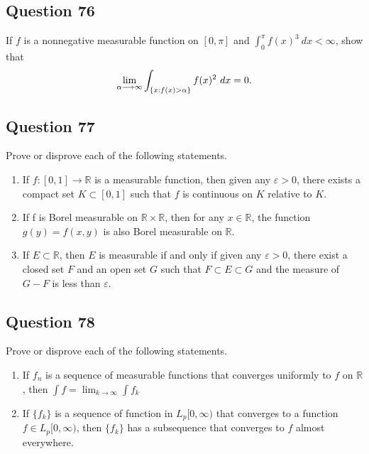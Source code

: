 \documentclass[12pt]{article}
\begin{document}
\hypertarget{question-76-1}{%
\subsection{Question 76}\label{question-76-1}}

If \(f\) is a nonnegative measurable function on \([0, \pi]\) and
\(\int_0^\pi f(x)^3~dx < \infty\), show that \begin{align*}
\lim_{\alpha\longrightarrow\infty} \int_{ \left\{{x :f(x) > \alpha}\right\} } f(x)^2 ~dx=0
.\end{align*}

\hypertarget{question-77-1}{%
\subsection{Question 77}\label{question-77-1}}

Prove or disprove each of the following statements.

\begin{enumerate}
\def\labelenumi{(\alph{enumi})}
\item
  If \(f : [0, 1] \to \mathbb{R}\) is a measurable function, then given
  any \(\varepsilon > 0\), there exists a compact set
  \(K \subset [0, 1]\) such that \(f\) is continuous on \(K\) relative
  to \(K\).
\item
  If f is Borel measurable on \(\mathbb{R} \times \mathbb{R}\), then for
  any \(x \in \mathbb{R}\), the function \(g(y) = f(x, y)\) is also
  Borel measurable on \(\mathbb{R}\).
\item
  If \(E \subset \mathbb{R}\), then \(E\) is measurable if and only if
  given any \(\varepsilon > 0\), there exist a closed set \(F\) and an
  open set \(G\) such that \(F \subset E \subset G\) and the measure of
  \(G-F\) is less than \(\varepsilon\).
\end{enumerate}

\hypertarget{question-78-1}{%
\subsection{Question 78}\label{question-78-1}}

Prove or disprove each of the following statements.

\begin{enumerate}
\def\labelenumi{(\alph{enumi})}
\setcounter{enumi}{1}
\item
  If \({f_n}\) is a sequence of measurable functions that converges
  uniformly to \(f\) on \(\mathbb{R}\), then
  \(\int{f}=\lim_{k\to \infty} \int f_k\)
\item
  If \(\{f_k\}\) is a sequence of function in \(L_p[0,\infty)\) that
  converges to a function \(f \in L_p [0,\infty)\), then \(\{f_k\}\) has
  a subsequence that converges to \(f\) almost everywhere.
\end{enumerate}
\end{document}
